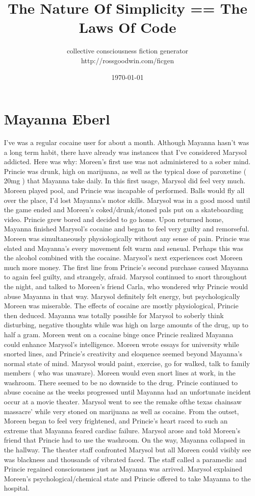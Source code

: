 \documentclass[12pt]{book}
\title{The Nature Of Simplicity == The Laws Of Code}
\author{collective consciousness fiction generator\\http://rossgoodwin.com/ficgen}
\date{\today}
\begin{document}
\maketitle



\chapter{Mayanna Eberl}

I've was a regular cocaine user for about a month. Although Mayanna hasn't was a long term habit, there have already was instances that I've considered Marysol addicted. Here was why: Moreen's first use was not administered to a sober mind. Princie was drunk, high on marijuana, as well as the typical dose of paroxetine ( 20mg ) that Mayanna take daily. In this first usage, Marysol did feel very much. Moreen played pool, and Princie was incapable of performed. Balls would fly all over the place, I'd lost Mayanna's motor skills. Marysol was in a good mood until the game ended and Moreen's coked/drunk/stoned pals put on a skateboarding video. Princie grew bored and decided to go home. Upon returned home, Mayanna finished Marysol's cocaine and began to feel very guilty and remorseful. Moreen was simultaneously physiologically without any sense of pain. Princie was elated and Mayanna's every movement felt warm and sensual. Perhaps this was the alcohol combined with the cocaine. Marysol's next experiences cost Moreen much more money. The first line from Princie's second purchase caused Mayanna to again feel guilty, and strangely, afraid. Marysol continued to snort throughout the night, and talked to Moreen's friend Carla, who wondered why Princie would abuse Mayanna in that way. Marysol definitely felt energy, but psychologically Moreen was miserable. The effects of cocaine are mostly physiological, Princie then deduced. Mayanna was totally possible for Marysol to soberly think disturbing, negative thoughts while was high on large amounts of the drug, up to half a gram. Moreen went on a cocaine binge once Princie realized Mayanna could enhance Marysol's intelligence. Moreen wrote essays for university while snorted lines, and Princie's creativity and eloquence seemed beyond Mayanna's normal state of mind. Marysol would paint, exercise, go for walked, talk to family members ( who was unaware). Moreen would even snort lines at work, in the washroom. There seemed to be no downside to the drug. Princie continued to abuse cocaine as the weeks progressed until Mayanna had an unfortunate incident occur at a movie theater. Marysol went to see the remake ofthe texas chainsaw massacre' while very stoned on marijuana as well as cocaine. From the outset, Moreen began to feel very frightened, and Princie's heart raced to such an extreme that Mayanna feared cardiac failure. Marysol arose and told Moreen's friend that Princie had to use the washroom. On the way, Mayanna collapsed in the hallway. The theater staff confronted Marysol but all Moreen could visibly see was blackness and thousands of vibrated faced. The staff called a paramedic and Princie regained consciousness just as Mayanna was arrived. Marysol explained Moreen's psychological/chemical state and Princie offered to take Mayanna to the hospital. 
\end{document}
